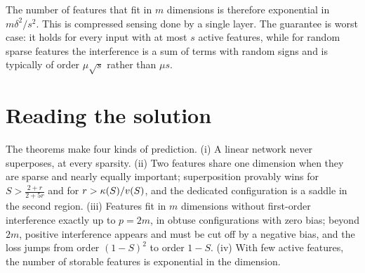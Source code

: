 \begin{refsection}
The number of features that fit in $m$ dimensions is therefore exponential in $m\delta^2/s^2$. This is compressed sensing done by a single layer. The guarantee is worst case: it holds for every input with at most $s$ active features, while for random sparse features the interference is a sum of terms with random signs and is typically of order $\mu\sqrt s$ rather than $\mu s$.

\section{Reading the solution}\label{sec:superposition:reading}

The theorems make four kinds of prediction. (i) A linear network never superposes, at every sparsity. (ii) Two features share one dimension when they are sparse and nearly equally important; superposition provably wins for $S>\frac{2+r}{2+5r}$ and for $r>\kappa(S)/v(S)$, and the dedicated configuration is a saddle in the second region. (iii) Features fit in $m$ dimensions without first-order interference exactly up to $p=2m$, in obtuse configurations with zero bias; beyond $2m$, positive interference appears and must be cut off by a negative bias, and the loss jumps from order $(1-S)^2$ to order $1-S$. (iv) With few active features, the number of storable features is exponential in the dimension.


\end{refsection}

